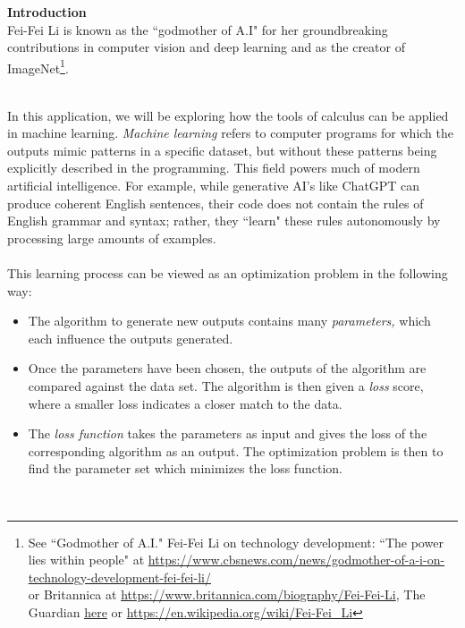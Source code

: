 \documentclass[11pt]{article}
\begin{document}
\pagestyle{otherpages}
\thispagestyle{firstpage}
\vspace*{.65in}

{\bf Introduction}\\
Fei-Fei Li is  known as the ``godmother of A.I" for her  groundbreaking contributions in computer vision and deep learning and as the creator of ImageNet\footnote{
See ``Godmother of A.I." Fei-Fei Li on technology development: ``The power lies within people" at \url{https://www.cbsnews.com/news/godmother-of-a-i-on-technology-development-fei-fei-li/}\\
 or Britannica at \url{https://www.britannica.com/biography/Fei-Fei-Li}, The Guardian \href{https://www.theguardian.com/technology/2023/nov/05/ai-pioneer-fei-fei-li-im-more-concerned-about- the-risks-that-are-here-and-now}{\underline{here}} or \url{https://en.wikipedia.org/wiki/Fei-Fei_Li} }. 
~\\\\
{
In this application, we will be exploring how the tools of calculus can be applied in machine learning. \textit{Machine learning} refers to computer programs for which the outputs mimic patterns in a specific dataset, but without these patterns being explicitly described in the programming. This field powers much of modern artificial intelligence. For example, while generative AI's like ChatGPT can produce coherent English sentences, their code does not contain the rules of English grammar and syntax; rather, they ``learn" these rules autonomously by processing large amounts of examples. \\\\
%
This learning process can be viewed as an optimization problem in the following way:
\begin{itemize}
    \item The algorithm to generate new outputs contains many \textit{parameters,} which each influence the outputs generated.
    \item Once the parameters have been chosen, the outputs of the algorithm are compared against the data set. The algorithm is then given a \textit{loss} score, where a smaller loss indicates a closer match to the data.
    \item The \textit{loss function} takes the parameters as input and gives the loss of the corresponding algorithm as an output. The optimization problem is then to find the parameter set which minimizes the loss function.
\end{itemize}
}~\\
\end{document}
